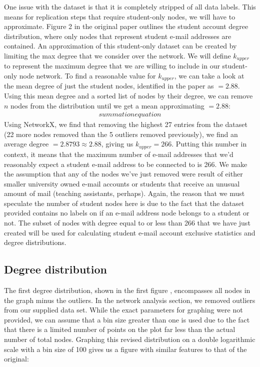\documentclass[a4paper]{article}
\begin{document}
\begin{multicols}{2}
One issue with the dataset is that it is completely stripped of all data labels. This means for replication steps that require student-only nodes, we will have to approximate. Figure 2 in the original paper outlines the student account degree distribution, where only nodes that represent student e-mail addresses are contained. An approximation of this student-only dataset can be created by limiting the max degree that we consider over the network. We will define \(k_{upper}\) to represent the maximum degree that we are willing to include in our student-only node network. To find a reasonable value for \(k_{upper}\), we can take a look at the mean degree of just the student nodes, identified in the paper as \(< k> =2.88\). Using this mean degree and a sorted list of nodes by their degree, we can remove \(n\) nodes from the distribution until we get a mean approximating \(< k> =2.88\):
\begin{align*}
summation equation
\end{align*} 
Using NetworkX, we find that removing the highest 27 entries from the dataset (22 more nodes removed than the 5 outliers removed previously), we find an average degree \(< k> = 2.8793 \approx 2.88\), giving us \(k_{upper} = 266\). Putting this number in context, it means that the maximum number of e-mail addresses that we'd reasonably expect a student e-mail address to be connected to is 266. We make the assumption that any of the nodes we've just removed were result of either smaller university owned e-mail accounts or students that receive an unusual amount of mail (teaching assistants, perhaps). Again, the reason that we must speculate the number of student nodes here is due to the fact that the dataset provided contains no labels on if an e-mail address node belongs to a student or not. The subset of nodes with degree equal to or less than 266 that we have just created will be used for calculating student e-mail account exclusive statistics and degree distributions.

\subsection{Degree distribution}
\hspace*{\parindent}The first degree distribution, shown in the first figure \cite{1}, encompasses all nodes in the graph minus the outliers. In the network analysis section, we removed outliers from our supplied data set. While the exact parameters for graphing were not provided, we can assume that a bin size greater than one is used due to the fact that there is a limited number of points on the plot far less than the actual number of total nodes. Graphing this revised distribution on a double logarithmic scale with a bin size of 100 gives us a figure with similar features to that of the original:


\end{multicols}
\end{document}

